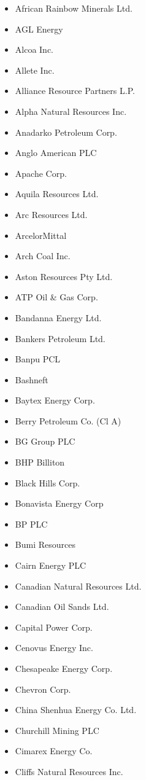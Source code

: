 \documentclass[10pt]{article}
\begin{document}
\begin{itemize}
  \item African Rainbow Minerals Ltd.
  \item AGL Energy
  \item Alcoa Inc.
  \item Allete Inc.
  \item Alliance Resource Partners L.P.
  \item Alpha Natural Resources Inc.
  \item Anadarko Petroleum Corp.
  \item Anglo American PLC
  \item Apache Corp.
  \item Aquila Resources Ltd.
  \item Arc Resources Ltd.
  \item ArcelorMittal
  \item Arch Coal Inc.
  \item Aston Resources Pty Ltd.
  \item ATP Oil \& Gas Corp.
  \item Bandanna Energy Ltd.
  \item Bankers Petroleum Ltd.
  \item Banpu PCL
  \item Bashneft
  \item Baytex Energy Corp.
  \item Berry Petroleum Co. (Cl A)
  \item BG Group PLC
  \item BHP Billiton
  \item Black Hills Corp.
  \item Bonavista Energy Corp
  \item BP PLC
  \item Bumi Resources
  \item Cairn Energy PLC
  \item Canadian Natural Resources Ltd.
  \item Canadian Oil Sands Ltd.
  \item Capital Power Corp.
  \item Cenovus Energy Inc.
  \item Chesapeake Energy Corp.
  \item Chevron Corp.
  \item China Shenhua Energy Co. Ltd.
  \item Churchill Mining PLC
  \item Cimarex Energy Co.
  \item Cliffs Natural Resources Inc.

\end{itemize}
\end{document}
